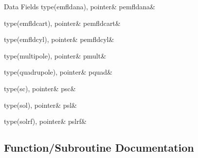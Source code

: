 \begin{DoxyFields}{Data Fields}
\mbox{\label{namespacebeamlineelemclass_a9da0a18e62bab91e16cf56935313b210}} 
type(emfldana), pointer&
pemfldana&
\\
\hline

\mbox{\label{namespacebeamlineelemclass_ae25137b123a2ee3f55fb97372dcae2ae}} 
type(emfldcart), pointer&
pemfldcart&
\\
\hline

\mbox{\label{namespacebeamlineelemclass_a255e033e63b5b259d76ed6bf738a8cf6}} 
type(emfldcyl), pointer&
pemfldcyl&
\\
\hline

\mbox{\label{namespacebeamlineelemclass_aa189f35902f7b7265e0485c363023f28}} 
type(multipole), pointer&
pmult&
\\
\hline

\mbox{\label{namespacebeamlineelemclass_a4dc5bf2560031246e9c34bc11576b75c}} 
type(quadrupole), pointer&
pquad&
\\
\hline

\mbox{\label{namespacebeamlineelemclass_ad948a3ca9b39d5bc89fabe69a16b26f2}} 
type(sc), pointer&
psc&
\\
\hline

\mbox{\label{namespacebeamlineelemclass_a227ca9307b3706cafe607d50bc6efaec}} 
type(sol), pointer&
psl&
\\
\hline

\mbox{\label{namespacebeamlineelemclass_ae4662d217dff6d83c07fe77d93525c61}} 
type(solrf), pointer&
pslrf&
\\
\hline

\end{DoxyFields}


\subsection{Function/\+Subroutine Documentation}
\mbox{\label{namespacebeamlineelemclass_a078ba2f100d1ff9fe51c4ff957e30897}} 
